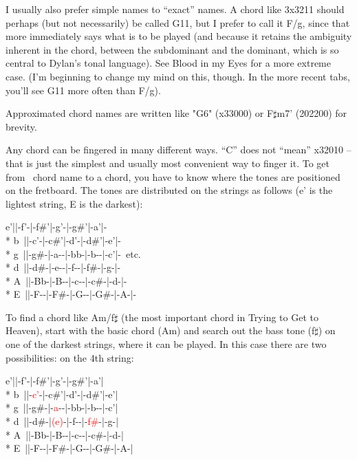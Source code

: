 \begin{articlelayout}
I usually also prefer simple names to ``exact'' names. A chord
like 3x3211 should perhaps (but not necessarily) be called G11, but I
prefer to call it F/g, since that more immediately says what is to be
played (and because it retains the ambiguity inherent in the chord,
between the subdominant and the dominant, which is so central to
Dylan's tonal language). See Blood in my Eyes for a more extreme
case. (I'm beginning to change my mind on this, though. In the more
recent tabs, you'll see G11 more often than F/g).

Approximated chord names are written like "G6" (x33000) or
F$\sharp$m7' (202200) for brevity.

Any chord can be fingered in many different ways. ``C'' does not
``mean'' x32010 -- that is just the simplest and usually most
convenient way to finger it. To get from~ chord name to a chord, you
have to know where the tones are positioned on the fretboard. The
tones are distributed on the strings as follows (e' is the lightest
string, E is the darkest):

\begin{pre}
\begin{adjustwidth}{2em}{0em}
e'||-f'-|-f\#'|-g'-|-g\#'|-a'|-\\*
b~||-c'-|-c\#'|-d'-|-d\#'|-e'|-\\*
g~||-g\#-|-a-{}-|-bb-|-b-{}-|-c'|-~etc.\\*
d~||-d\#-|-e-{}-|-f-{}-|-f\#-|-g-|-\\*
A~||-Bb-|-B-{}-|-c-{}-|-c\#-|-d-|-\\*
E~||-F-{}-|-F\#-|-G-{}-|-G\#-|-A-|-
\end{adjustwidth}
\end{pre}

To find a chord like Am/f$\sharp$ (the most important chord in Trying
to Get to Heaven), start with the basic chord (Am) and search out the
bass tone (f$\sharp$) on one of the darkest strings, where it can be
played. In this case there are two possibilities: on the 4th string:

\begin{pre}
\begin{adjustwidth}{2em}{0em}
e'||-f'-|-f\#'|-g'-|-g\#'|-a'|\\*
b~||-\textcolor{red}{c'}-|-c\#'|-d'-|-d\#'|-e'|\\*
g~||-g\#-|-\textcolor{red}{a}-{}-|-bb-|-b-{}-|-c'|\\*
d~||-d\#-|\textcolor{red}{(e)}-|-f-{}-|-\textcolor{red}{f\#}-|-g-|\\*
A~||-Bb-|-B-{}-|-c-{}-|-c\#-|-d-|\\*
E~||-F-{}-|-F\#-|-G-{}-|-G\#-|-A-|
\end{adjustwidth}
\end{pre}


\end{articlelayout}
